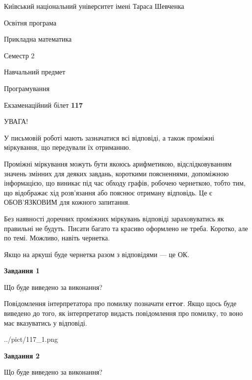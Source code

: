 \documentclass[12pt, ukrainian]{article}
\begin{document}
{{\begin {small}\par
{ \center  Київський національний університет імені Тараса Шевченка \par}
{\parbox {5 cm}{Освітня програма \hfill}{\parbox {7 cm}{Прикладна математика \hfill}}\parbox {6 cm}{\hfill Семестр 2}}\par
{\parbox {5 cm} {Навчальний предмет \hfill}\parbox {7 cm}{Програмування \hfill}\parbox {6cm}{\hfill}\par}\vspace{-7pt} \end{small}}{\center Екзаменаційний білет \No \textbf
{ 117 }\par}}
{
\begin {large}
УВАГА!

У письмовій роботі мають зазначатися всі відповіді, а також проміжні міркування, що передували їх отриманню.

Проміжні міркування можуть бути якоюсь арифметикою, відслідковуванням зна\-чень змінних для деяких завдань,
короткими поясненнями, допоміжною інформацією, що виникає під час обходу графів, робочею чернеткою,
тобто тим, що відображає хід розв’язання або пояснює отриману відповідь.
Це є ОБОВ’ЯЗКОВИМ для кожного запитання.

Без наявності доречних проміжних міркувань відповіді зараховуватись як правиль\-ні не будуть.
Писати багато та красиво оформлено не треба. Коротко, але по темі. Можли\-во, навіть чернетка.

Якщо на аркуші буде чернетка разом з відповідями --- це ОК.

\newpage

{\begin {center}\textbf{Завдання 1}\end {center}}\par
Що буде виведено за виконання?

Повідомлення інтерпретатора про помилку позначати \textbf{error}.
Якщо щось буде виведено до того, як інтерпретатор видасть повідомлення про помилку, 
то воно має вказуватись у відповіді. \par


\begin{center}
	{../pict/117_1.png}
\end{center}
\newpage

{\begin {center}\textbf{Завдання 2}\end {center}}\par
Що буде виведено за виконання?


\end{large}}
\end{document}
